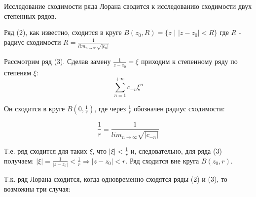 \documentclass[a4paper, 12pt]{report}
\begin{document}
Исследование сходимости ряда Лорана сводится к исследованию сходимости двух степенных рядов.
\par
Ряд (2), как известно, сходится в круге $B(z_0, R) = \{z $ $|$ $ |z - z_0| < R\}$ где $R$ - радиус сходимости $R = \frac{1}{lim_{n \to \infty} \sqrt{|c_n|}}$
\par\bigskip
Рассмотрим ряд (3). Сделав замену $\frac{1}{z - z_0} = \xi$ приходим к степенному ряду по степеням $\xi$: 
$$\sum_{n = 1}^{+\infty} c_{-n} \xi^n$$
\par\bigskip
Он сходится в круге $B(0, \frac{1}{r})$, где через $\frac{1}{r}$ обозначен радиус сходимости:
\par\bigskip
$$\frac{1}{r} = \frac{1}{lim_{n \to \infty} \sqrt{|c_{-n}|}}$$
\par\bigskip
Т.е. ряд сходится для таких $\xi$, что $|\xi| < \frac{1}{r}$ и, следовательно, для ряда (3) получаем:
$|\xi| = \frac{1}{|z - z_0|} < \frac{1}{r} \Rightarrow |z - z_0| < r$. Ряд сходится вне круга $B(z_0, r)$.
\par\bigskip
Т.к. ряд Лорана сходится, когда одновременно сходятся ряды (2) и (3), то возможны три случая:
\par\bigskip
\end{document}

